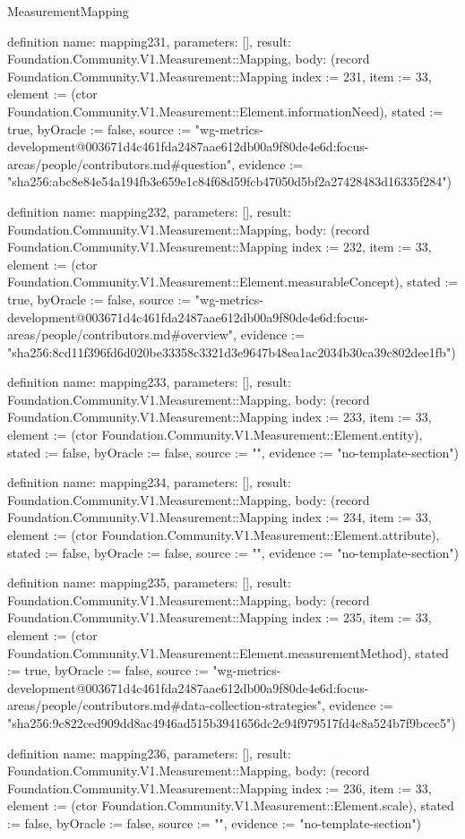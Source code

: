 \begin{lexlean}{MeasurementMapping}
\begin{semanticmodule}
definition{
  name: mapping231,
  parameters: [],
  result: Foundation.Community.V1.Measurement::Mapping,
  body: (record Foundation.Community.V1.Measurement::Mapping {index := 231, item := 33, element := (ctor Foundation.Community.V1.Measurement::Element.informationNeed), stated := true, byOracle := false, source := "wg-metrics-development@003671d4c461fda2487aae612db00a9f80de4e6d:focus-areas/people/contributors.md#question", evidence := "sha256:abc8e84e54a194fb3e659e1c84f68d59fcb47050d5bf2a27428483d16335f284"})
}

definition{
  name: mapping232,
  parameters: [],
  result: Foundation.Community.V1.Measurement::Mapping,
  body: (record Foundation.Community.V1.Measurement::Mapping {index := 232, item := 33, element := (ctor Foundation.Community.V1.Measurement::Element.measurableConcept), stated := true, byOracle := false, source := "wg-metrics-development@003671d4c461fda2487aae612db00a9f80de4e6d:focus-areas/people/contributors.md#overview", evidence := "sha256:8cd11f396fd6d020be33358c3321d3e9647b48ea1ac2034b30ca39c802dee1fb"})
}

definition{
  name: mapping233,
  parameters: [],
  result: Foundation.Community.V1.Measurement::Mapping,
  body: (record Foundation.Community.V1.Measurement::Mapping {index := 233, item := 33, element := (ctor Foundation.Community.V1.Measurement::Element.entity), stated := false, byOracle := false, source := "", evidence := "no-template-section"})
}

definition{
  name: mapping234,
  parameters: [],
  result: Foundation.Community.V1.Measurement::Mapping,
  body: (record Foundation.Community.V1.Measurement::Mapping {index := 234, item := 33, element := (ctor Foundation.Community.V1.Measurement::Element.attribute), stated := false, byOracle := false, source := "", evidence := "no-template-section"})
}

definition{
  name: mapping235,
  parameters: [],
  result: Foundation.Community.V1.Measurement::Mapping,
  body: (record Foundation.Community.V1.Measurement::Mapping {index := 235, item := 33, element := (ctor Foundation.Community.V1.Measurement::Element.measurementMethod), stated := true, byOracle := false, source := "wg-metrics-development@003671d4c461fda2487aae612db00a9f80de4e6d:focus-areas/people/contributors.md#data-collection-strategies", evidence := "sha256:9c822ced909dd8ac4946ad515b3941656dc2c94f979517fd4c8a524b7f9bcec5"})
}

definition{
  name: mapping236,
  parameters: [],
  result: Foundation.Community.V1.Measurement::Mapping,
  body: (record Foundation.Community.V1.Measurement::Mapping {index := 236, item := 33, element := (ctor Foundation.Community.V1.Measurement::Element.scale), stated := false, byOracle := false, source := "", evidence := "no-template-section"})
}


\end{semanticmodule}
\end{lexlean}
